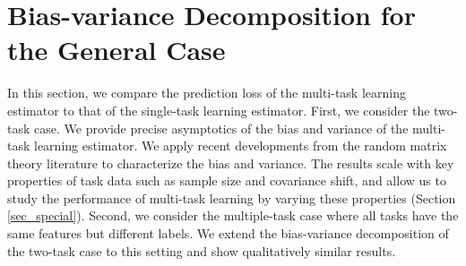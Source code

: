 \section{Bias-variance Decomposition for the General Case}\label{sec_general}

In this section, we compare the prediction loss of the multi-task learning estimator to that of the single-task learning estimator.
First, we consider the two-task case.
We provide precise asymptotics of the bias and variance of the multi-task learning estimator.
We apply recent developments from the random matrix theory literature to characterize the bias and variance.
The results scale with key properties of task data such as sample size and covariance shift, and allow us to study the performance of multi-task learning by varying these properties (Section \ref{sec_special}).
Second, we consider the multiple-task case where all tasks have the same features but different labels.
We extend the bias-variance decomposition of the two-task case to this setting and show qualitatively similar results.

